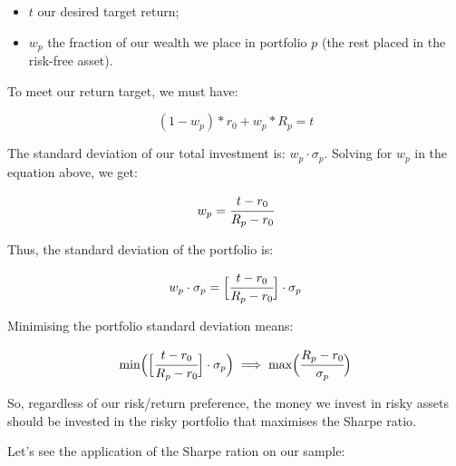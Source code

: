 \begin{itemize}
\tightlist
\item
  \(t\) our desired target return;
\item
  \(w_p\) the fraction of our wealth we place in portfolio \(p\) (the
  rest placed in the risk-free asset).
\end{itemize}

To meet our return target, we must have:

\[ (1 - w_p) * r_0 + w_p * R_p = t \]

The standard deviation of our total investment is:
\(w_p\cdot \sigma_p\). Solving for \(w_p\) in the equation above, we
get:

\[ w_p = \cfrac{t - r_0}{R_p - r_0} \]

Thus, the standard deviation of the portfolio is:

\[ w_p\cdot \sigma_p = \Big[\cfrac{t - r_0}{R_p - r_0}\Big]\cdot \sigma_p \]

Minimising the portfolio standard deviation means:

\[ \textrm{min}\Big(\Big[\cfrac{t - r_0}{R_p - r_0}\Big]\cdot \sigma_p\Big)\implies\textrm{max}\Big(\cfrac{R_p - r_0}{\sigma_p}\Big) \]

So, regardless of our risk/return preference, the money we invest in
risky assets should be invested in the risky portfolio that maximises
the Sharpe ratio.

Let's see the application of the Sharpe ration on our sample:

